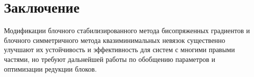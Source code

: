 \section{Заключение}
\label{sec:Chapter5} 


Модификации блочного стабилизированного метода бисопряженных градиентов
 и блочного симметричного метода квазиминимальных невязок существенно улучшают
их устойчивость и эффективность для систем с многими правыми частями, 
но требуют дальнейшей работы по обобщению параметров и оптимизации редукции блоков.


\newpage
